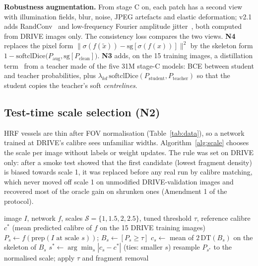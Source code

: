 \documentclass[conference]{IEEEtran}
\begin{document}
\textbf{Robustness augmentation.} From stage C on, each patch has a second view with illumination fields, blur, noise, JPEG artefacts and elastic deformation; v2.1 adds RandConv~\cite{xu2021randconv} and low-frequency Fourier amplitude jitter~\cite{xu2021fourier}, both computed from DRIVE images only. The consistency loss compares the two views. \textbf{N4} replaces the pixel form $\|\sigma(f(\tilde x))-\mathrm{sg}[\sigma(f(x))]\|^2$ by the skeleton form $1-\mathrm{softclDice}\big(P_{\mathrm{aug}},\mathrm{sg}[P_{\mathrm{clean}}]\big)$. \textbf{N3} adds, on the 15 training images, a distillation term~\cite{hinton2015} from a teacher made of the five 31M stage-C models: BCE between student and teacher probabilities, plus $\lambda_{kd}\,\mathrm{softclDice}(P_{\mathrm{student}},P_{\mathrm{teacher}})$ so that the student copies the teacher's soft \emph{centrelines}.

\subsection{Test-time scale selection (N2)}
HRF vessels are thin after FOV normalisation (Table~\ref{tab:data}), so a network trained at DRIVE's calibre sees unfamiliar widths. Algorithm~\ref{alg:scale} chooses the scale per image without labels or weight updates. The rule was set on DRIVE only: after a smoke test showed that the first candidate (lowest fragment density) is biased towards scale 1, it was replaced before any real run by calibre matching, which never moved off scale 1 on unmodified DRIVE-validation images and recovered most of the oracle gain on shrunken ones (Amendment 1 of the protocol).

\begin{algorithm}[t]
\caption{Calibre-guided scale selection}
\label{alg:scale}
\begin{algorithmic}[1]
\small
\REQUIRE image $I$, network $f$, scales $\mathcal S=\{1,1.5,2,2.5\}$, tuned threshold $\tau$, reference calibre $c^{*}$ (mean predicted calibre of $f$ on the 15 DRIVE training images)
  \STATE $P_s\leftarrow f(\mathrm{prep}(I\text{ at scale }s))$;\; $B_s\leftarrow[P_s\ge\tau]$
  \STATE $c_s\leftarrow$ mean of $2\,\mathrm{DT}(B_s)$ on the skeleton of $B_s$
\ENDFOR
\STATE $s^{*}\leftarrow\arg\min_{s}|c_s-c^{*}|$ (ties: smaller $s$)
\STATE resample $P_{s^{*}}$ to the normalised scale; apply $\tau$ and fragment removal
\end{algorithmic}
\end{algorithm}
\end{document}
